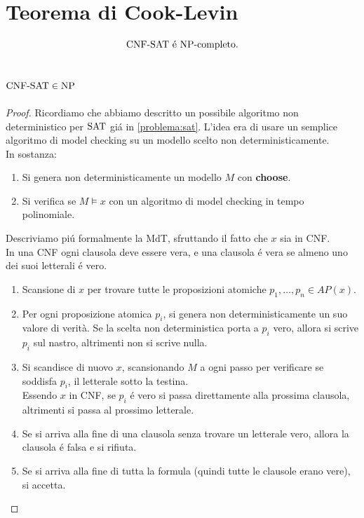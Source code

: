 \section{Teorema di Cook-Levin}
\label{theorem:cook_levin}
\[\text{CNF-SAT} \text{ é } \text{NP}\text{-completo}.\]

\subsection{$\text{CNF-SAT} \in \text{NP}$}
\begin{proof}
Ricordiamo che abbiamo descritto un possibile algoritmo non deterministico
per $\text{SAT}$ giá in \ref{problema:sat}. L'idea era di usare un semplice algoritmo
di model checking su un modello scelto non deterministicamente. \\

In sostanza: \begin{enumerate}
\item Si genera non deterministicamente un modello $M$ con \textbf{choose}.
\item Si verifica se $M \models x$ con un algoritmo di model checking in tempo polinomiale.\\
\end{enumerate}

Descriviamo piú formalmente la MdT, sfruttando il fatto che $x$ sia in CNF. \\
In una CNF ogni clausola deve essere vera, e una clausola é vera se almeno uno dei suoi letterali é vero.
\begin{enumerate}
\item Scansione di $x$ per trovare tutte le proposizioni atomiche $p_1, \ldots, p_n \in AP(x)$.
\item Per ogni proposizione atomica $p_i$, si genera non deterministicamente un suo valore di verità. 
Se la scelta non deterministica porta a $p_i$ vero, allora si scrive $p_i$ sul nastro, altrimenti non si scrive nulla.
\item Si scandisce di nuovo $x$, scansionando $M$ a ogni passo per verificare se soddisfa $p_i$, il letterale sotto la testina. \\
    Essendo $x$ in CNF, se $p_i$ é vero si passa direttamente alla prossima clausola, altrimenti si passa al prossimo letterale.
\item Se si arriva alla fine di una clausola senza trovare un letterale vero, allora la clausola é falsa e si rifiuta.
\item Se si arriva alla fine di tutta la formula (quindi tutte le clausole erano vere), si accetta.
\end{enumerate}



\end{proof}
